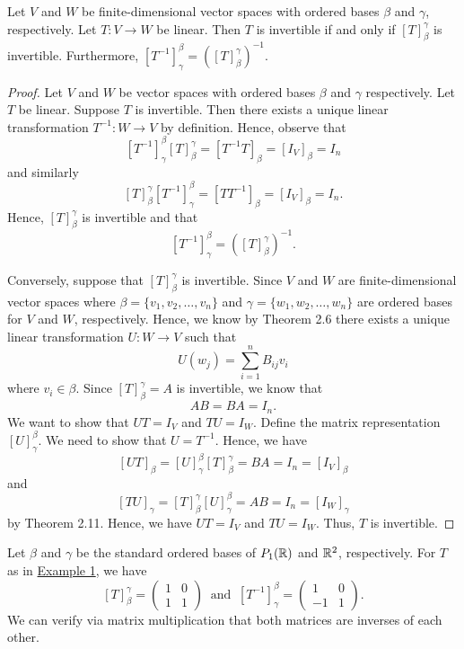 \begin{theorem}
   Let \( V  \) and \( W  \) be finite-dimensional vector spaces with ordered bases \( \beta \) and \( \gamma  \), respectively. Let \( T: V \to W  \) be linear. Then \( T  \) is invertible if and only if \( [T]_{\beta}^{\gamma}   \) is invertible. Furthermore, \( [T^{-1}]_{\gamma}^{\beta}  = ([T]_{\beta}^{\gamma} )^{-1} \).
\end{theorem}
\begin{proof}
Let \( V  \) and \( W  \) be vector spaces with ordered bases \( \beta  \) and \( \gamma \) respectively. Let \( T  \) be linear. Suppose \( T  \) is invertible. Then there exists a unique linear transformation \( T^{-1}: W \to V  \) by definition. Hence, observe that 
\[  [T^{-1}]_{\gamma}^{\beta}  [T]_{\beta}^{\gamma}  = [T^{-1}T ]_{\beta} = [{I}_{V}]_{\beta} = {I}_{n}  \]
and similarly
\[ [T]_{\beta}^{\gamma}  [T^{-1}]_{\gamma}^{\beta}  = [T T^{-1}]_{\beta} = [{I}_{V}]_{\beta} = {I}_{n}.        \]
Hence, \( [T]_{\beta}^{\gamma}  \) is invertible and that 
\[ [T^{-1}]_{\gamma}^{\beta}  = ([T]_{\beta}^{\gamma} )^{-1}.  \]

Conversely, suppose that \( [T]_{\beta}^{\gamma}  \) is invertible. Since \( V \) and \( W  \) are finite-dimensional vector spaces where  \( \beta = \{ {v}_{1}, {v}_{2}, \dots, {v}_{n} \}  \) and \( \gamma = \{ {w}_{1}, {w}_{2}, \dots, {w}_{n} \}  \) are ordered bases for \( V  \) and \( W  \), respectively. Hence, we know by Theorem 2.6 there exists a unique linear transformation \( U: W \to V  \) such that 
\[  U({w}_{j}) = \sum_{ i = 1   }^{ n } {B}_{ij} {v}_{i}    \]
where \( {v}_{i} \in \beta \). Since \( [T]_{\beta}^{\gamma} = A   \) is invertible, we know that 
\[  AB = BA = I_n.  \] We want to show that \( UT = {I}_{V}  \) and \( TU = {I}_{W} \). Define the matrix representation \( [U]_{\gamma}^{\beta}  \). We need to show that \(  U = T^{-1} \). Hence, we have
\[  [UT]_{\beta} = [U]_{\gamma}^{\beta} [T]_{\beta}^{\gamma} = BA = {I}_{n} = [{I}_{V}]_{\beta}      \]
and 
\[ [TU]_{\gamma} = [T]_{\beta}^{\gamma} [U]_{\gamma}^{\beta} = AB = {I}_{n} = [{I}_{W}]_{\gamma}      \]
by Theorem 2.11. Hence, we have \( UT = {I}_{V}  \) and \( TU = {I}_{W} \). Thus, \( T  \) is invertible.
\end{proof}

\begin{eg}
    Let \( \beta  \) and \( \gamma  \) be the standard ordered bases of \( {P}_{1}(\mathbb{R})  \) and \( \mathbb{R}^{2} \), respectively. For \( T  \) as in {\hyperref[Eg 2.4.1]{Example 1}}, we have  
    \[  [T]_{\beta}^{\gamma} = \begin{pmatrix}
        1 & 0 \\
        1 & 1 
    \end{pmatrix}  \ \text{ and } \ [T^{-1}]_{\gamma}^{\beta} = \begin{pmatrix}
        1 & 0 \\
        -1 & 1 
    \end{pmatrix}.\]
    We can verify via matrix multiplication that both matrices are inverses of each other.
\end{eg}

